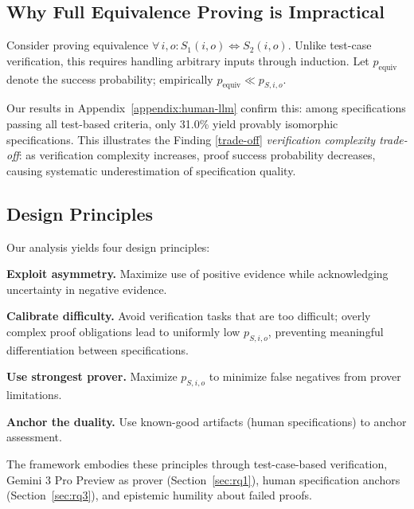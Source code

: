 \subsection{Why Full Equivalence Proving is Impractical}

Consider proving equivalence $\forall\, i, o : S_1(i, o) \Leftrightarrow S_2(i, o)$. Unlike test-case verification, this requires handling arbitrary inputs through induction. Let $p_{\text{equiv}}$ denote the success probability; empirically $p_{\text{equiv}} \ll p_{S,i,o}$.

Our results in Appendix~\ref{appendix:human-llm} confirm this: among specifications passing all test-based criteria, only 31.0\% yield provably isomorphic specifications. This illustrates the
Finding \ref{trade-off} \emph{verification complexity trade-off}: as verification complexity increases, proof success probability decreases, causing systematic underestimation of specification quality.

\subsection{Design Principles}

Our analysis yields four design principles:

\textbf{Exploit asymmetry.} Maximize use of positive evidence while acknowledging uncertainty in negative evidence.

\textbf{Calibrate difficulty.} Avoid verification tasks that are too difficult; overly complex proof obligations lead to uniformly low $p_{S,i,o}$, preventing meaningful differentiation between specifications.

\textbf{Use strongest prover.} Maximize $p_{S,i,o}$ to minimize false negatives from prover limitations.

\textbf{Anchor the duality.} Use known-good artifacts (human specifications) to anchor assessment.

The \ours{} framework embodies these principles through test-case-based verification, Gemini 3 Pro Preview as prover (Section~\ref{sec:rq1}), human specification anchors (Section~\ref{sec:rq3}), and epistemic humility about failed proofs.
